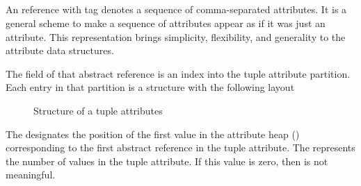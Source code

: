 
\subsection{}
\label{sec:ifc:AttrSort:Tuple}

An  reference with tag  denotes a sequence of comma-separated attributes.
It is a general scheme to make a sequence of attributes appear as if it was just an attribute.  This representation
brings simplicity, flexibility, and generality to the attribute data structures.

The  field of that abstract reference is an index into the tuple attribute partition.
Each entry in that partition is a structure with the following layout
%
\begin{figure}[H]
    \centering
    \caption{Structure of a tuple attributes}
    \label{fig:ifc:AttrSort:Tuple}
\end{figure}
The  designates the position of the first  value in the 
attribute heap () corresponding to the first abstract reference in the 
tuple attribute.
The  represents the number of  values in the tuple attribute.
If this value is zero, then  is not meaningful.

